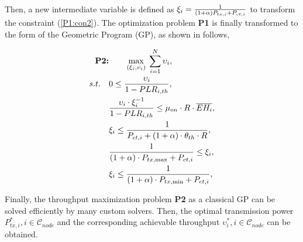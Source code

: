 \documentclass[journal,10pt]{IEEEtran}
\begin{document}
Then, a new intermediate variable is defined as ${\xi_i} = {1 \over { {\left( {1 + \alpha } \right){P_{tx,i}} + {P_{ct,i}}} }}$ to transform the constraint (\ref{P1:con2}). The optimization problem \textbf{P1} is finally transformed to the form of the Geometric Program (GP), as shown in follows,

\begin{subequations}\label{P2:PRCS} \small
\begin{align}
    \textbf{P2:}& \qquad\mathop {\max }\limits_{\small{({{\xi_i},{\upsilon_i}})}} \; {\sum\limits_{i = 1}^{ N} {{\upsilon_i}} } , \label{P2:obj} \\
    s.t.\quad %
		& {\rm{0}} \le {{{\upsilon_i}} \over {1 - PL{R_{i,th}}}},\label{P2:con1}\\
    & {{{{\upsilon_i} \cdot \xi_i^{ - 1}} \over {1 - PL{R_{i,th}}}} \le {\mu _{on}} \cdot R \cdot \overline{EH_{i}} },\label{P2:con2}\\
    & {{\xi_i} \le {1 \over {{P_{ct,i}} + \left( {1 + \alpha } \right) \cdot {\theta _{th}} \cdot R}}},\label{P2:con3}\\
    & {1 \over {\left( {1 + \alpha } \right) \cdot {P_{tx,\max }} + {P_{ct,i}}}}  \le {\xi_i} , \label{P2:con4} \\
		& {\xi_i} \le {1 \over {\left( {1 + \alpha } \right) \cdot {P_{tx,\min }} + {P_{ct,i}}}}, \label{P2:con5}
\end{align}
\end{subequations}

Finally, the throughput maximization problem \textbf{P2} as a classical GP can be solved efficiently by many custom solvers. Then, the optimal transmission power $P_{tx,i}^{*}, i \in \mathcal{C}_{node} $ and the corresponding achievable throughput $\upsilon_i^{*}, i \in \mathcal{C}_{node} $ can be obtained.
\end{document}
